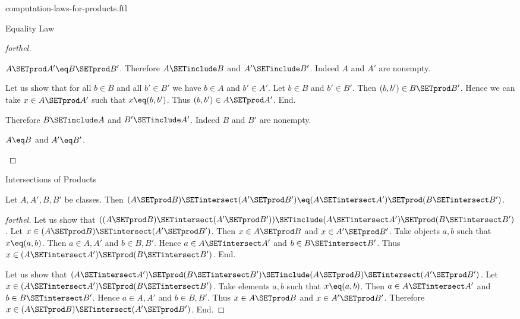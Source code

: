 \documentclass{naproche-library}
\begin{document}
\begin{smodule}[title=Computation Laws for Cartesian Products]{computation-laws-for-products.ftl}
\begin{sfragment}{Equality Law}
\begin{proof}[forthel]
\begin{case}{$A \SETprod A' \eq B \SETprod B'$.}
      Therefore $A \SETinclude B$ and $A' \SETinclude B'$.
      Indeed $A$ and $A'$ are nonempty.

      Let us show that for all $b \in B$ and all $b' \in B'$ we have $b \in A$ and $b' \in A'$.
        Let $b \in B$ and $b' \in B'$.
        Then $(b, b') \in B \SETprod B'$.
        Hence we can take $x \in A \SETprod A'$ such that $x \eq (b, b')$.
        Thus $(b, b') \in A \SETprod A'$.
      End.

      Therefore $B \SETinclude A$ and $B' \SETinclude A'$.
      Indeed $B$ and $B'$ are nonempty.
    \end{case}

    \begin{case}{$A \eq B$ and $A' \eq B'$.} \end{case}
  \end{proof}
\end{sfragment}

\begin{sfragment}{Intersections of Products}
  \begin{proposition}[forthel,id=FOUNDATIONS_05_4154592050806784]
    Let $A, A', B, B'$ be classes.
    Then $(A \SETprod B) \SETintersect (A' \SETprod B') \eq (A \SETintersect A') \SETprod (B \SETintersect B')$.
  \end{proposition}
  \begin{proof}[forthel]
    Let us show that $((A \SETprod B) \SETintersect (A' \SETprod B')) \SETinclude (A \SETintersect A') \SETprod (B \SETintersect B')$. %
      Let $x \in (A \SETprod B) \SETintersect (A' \SETprod B')$.
      Then $x \in A \SETprod B$ and $x \in A' \SETprod B'$.
      Take objects $a, b$ such that $x \eq (a, b)$.
      Then $a \in A, A'$ and $b \in B, B'$.
      Hence $a \in A \SETintersect A'$ and $b \in B \SETintersect B'$.
      Thus $x \in (A \SETintersect A') \SETprod (B \SETintersect B')$.
    End.

    Let us show that $(A \SETintersect A') \SETprod (B \SETintersect B') \SETinclude (A \SETprod B) \SETintersect (A' \SETprod B')$.
      Let $x \in (A \SETintersect A') \SETprod (B \SETintersect B')$.
      Take elements $a, b$ such that $x \eq (a, b)$.
      Then $a \in A \SETintersect A'$ and $b \in B \SETintersect B'$.
      Hence $a \in A, A'$ and $b \in B, B'$.
      Thus $x \in A \SETprod B$ and $x \in A' \SETprod B'$.
      Therefore $x \in (A \SETprod B) \SETintersect (A' \SETprod B')$.
    End.
  \end{proof}
\end{sfragment}


\end{smodule}
\end{document}
